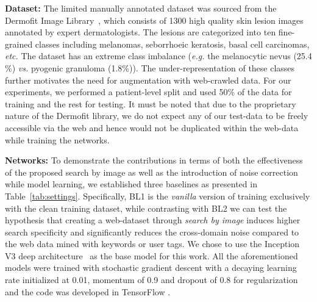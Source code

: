 \documentclass{llncs}
\begin{document}
\textbf{Dataset:} The limited manually annotated dataset was sourced from the Dermofit Image Library~\cite{dermofit}, which consists of 1300 high quality skin lesion images annotated by expert dermatologists. The lesions are categorized into ten fine-grained classes including melanomas, seborrhoeic keratosis, basal cell carcinomas, \textit{etc.} The dataset has an extreme class imbalance (\textit{e.g.} the melanocytic nevus (25.4 \%) \textit{vs.} pyogenic granuloma (1.8\%)). The under-representation of these classes further motivates the need for augmentation with web-crawled data. For our experiments, we performed a patient-level split and used 50\% of the data for training and the rest for testing. It must be noted that due to the proprietary nature of the Dermofit library, we do not expect any of our test-data to be freely accessible via the web and hence would not be duplicated within the web-data while training the networks. 



\noindent\textbf{Networks:} To demonstrate the contributions in terms of both the effectiveness of the proposed search by image as well as the introduction of noise correction while model learning, we established three baselines as presented in Table~\ref{tab:settings}. Specifically, BL1 is the \textit{vanilla} version of training exclusively with the clean training dataset, while contrasting with BL2 we can test the hypothesis that creating a web-dataset through \textit{search by image} induces higher search specificity and significantly reduces the cross-domain noise compared to the web data mined with keywords or user tags. We chose to use the Inception V3 deep architecture~\cite{inceptionv3} as the base model for this work. All the aforementioned models were trained with stochastic gradient descent with a decaying learning rate initialized at 0.01, momentum of 0.9 and dropout of 0.8 for regularization and the code was developed in TensorFlow \cite{tensorflow}.
\end{document}
